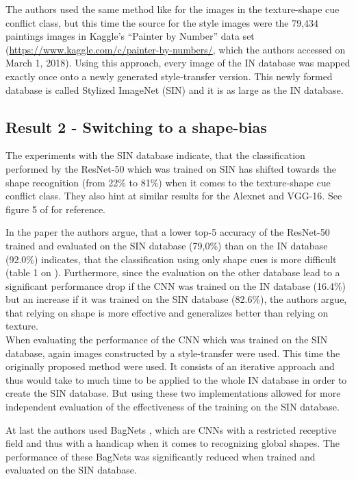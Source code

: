 \documentclass[runningheads,a4paper]{llncs}
\begin{document}
The authors used the same method like for the images in the texture-shape cue conflict class, but this time the source for the style images were the 79,434 paintings images in Kaggle's ``Painter by Number'' data set (\url{https://www.kaggle.com/c/painter-by-numbers/}, which the authors accessed on March 1, 2018). Using this approach, every image of the IN database was mapped exactly once onto a newly generated style-transfer version. This newly formed database is called Stylized ImageNet (SIN) and it is as large as the IN database.

\subsection{Result 2 - Switching to a shape-bias}

The experiments with the SIN database indicate, that the classification performed by the ResNet-50 which was trained on SIN has shifted towards the shape recognition (from 22\% to 81\%) when it comes to the texture-shape cue conflict class. They also hint at similar results for the Alexnet and VGG-16. See figure 5 of \citet{geirhos2018imagenet} for reference.

In the paper the authors argue, that a lower top-5 accuracy of the ResNet-50 trained and evaluated on the SIN database (79,0\%) than on the IN database (92.0\%) indicates, that the classification using only shape cues is more difficult (table 1 on \citet{geirhos2018imagenet}). Furthermore, since the evaluation on the other database lead to a significant performance drop if the CNN was trained on the IN database (16.4\%) but an increase if it was trained on the SIN database (82.6\%), the authors argue, that relying on shape is more effective and generalizes better than relying on texture.\\

When evaluating the performance of the CNN which was trained on the SIN database, again images constructed by a style-transfer were used. This time the originally proposed method \citep{gatys2016image} were used. It consists of an iterative approach and thus would take to much time to be applied to the whole IN database in order to create the SIN database. But using these two implementations allowed for more independent evaluation of the effectiveness of the training on the SIN database.

At last the authors used BagNets \citep{brendel2019approximating}, which are CNNs with a restricted receptive field and thus with a handicap when it comes to recognizing global shapes. The performance of these BagNets was significantly reduced when trained and evaluated on the SIN database. 
\end{document}
